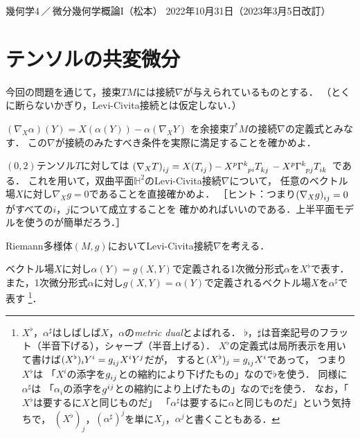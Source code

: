 \documentclass[uplatex,dvipdfmx,fontsize=12pt,jafontsize=11pt,line_length=42zw,number_of_lines=36,hanging_punctuation]{jlreq}
\begin{document}
\begin{flushleft}
	幾何学4\,／\,微分幾何学概論I（松本）
	\hfill
	2022年10月31日（2023年3月5日改訂）
\end{flushleft}
\setcounter{section}{3}
\section{テンソルの共変微分}

今回の問題を通じて，接束$TM$には接続$\nabla$が与えられているものとする．
（とくに断らないかぎり，Levi-Civita接続とは仮定しない．）

\begin{problems}
	\item[4.1]
		$(\nabla_X\alpha)(Y)=X(\alpha(Y))-\alpha(\nabla_XY)$
		を余接束$T^*M$の接続$\nabla$の定義式とみなす．
		この$\nabla$が接続のみたすべき条件を実際に満足することを確かめよ．
	\item[4.2$^\star$]
		$(0,2)$テンソル$T$に対しては
		$\tensor{(\nabla_XT)}{_i_j}=X(\tensor{T}{_i_j})
		-\tensor{X}{^p}\tensor{\Gamma}{^k_p_i}\tensor{T}{_k_j}
		-\tensor{X}{^p}\tensor{\Gamma}{^k_p_j}\tensor{T}{_i_k}$
		である．
		これを用いて，双曲平面$\mathbb{H}^2$のLevi-Civita接続$\nabla$について，
		任意のベクトル場$X$に対し$\nabla_Xg=0$であることを直接確かめよ．
		［ヒント：つまり$\tensor{(\nabla_Xg)}{_i_j}=0$がすべての$i$，$j$について成立することを
		確かめればいいのである．上半平面モデルを使うのが簡単だろう．］
	\item[4.3]
		Riemann多様体$(M,g)$においてLevi-Civita接続$\nabla$を考える．
		\begin{subproblems}
			\item[(1)]
				ベクトル場$X$に対し$\alpha(Y)=g(X,Y)$で定義される1次微分形式$\alpha$を$X^\flat$で表す．
				また，1次微分形式$\alpha$に対し$g(X,Y)=\alpha(Y)$で定義されるベクトル場$X$を$\alpha^\sharp$で表す
				\footnote{$X^\flat$，$\alpha^\sharp$はしばしば$X$，$\alpha$の\emph{metric dual}とよばれる．
				$\flat$，$\sharp$は音楽記号のフラット（半音下げる），シャープ（半音上げる）．
				$X^\flat$の定義式は局所表示を用いて書けば$(X^\flat)_iY^i=\tensor{g}{_i_j}X^iY^j$だが，
				すると$(X^\flat)_j=\tensor{g}{_i_j}X^i$であって，
				つまり$X^\flat$は
				「$X^i$の添字を$\tensor{g}{_i_j}$との縮約により下げたもの」なので$\flat$を使う．
				同様に$\alpha^\sharp$は
				「$\alpha_i$の添字を$\tensor{g}{^i^j}$との縮約により上げたもの」なので$\sharp$を使う．
				なお，「$X^\flat$は要するに$X$と同じものだ」
				「$\alpha^\sharp$は要するに$\alpha$と同じものだ」という気持ちで，
				$(X^\flat)_j$，$(\alpha^\sharp)^j$を単に$X_j$，$\alpha^j$と書くこともある．}．

\end{subproblems}
\end{problems}
\end{document}
